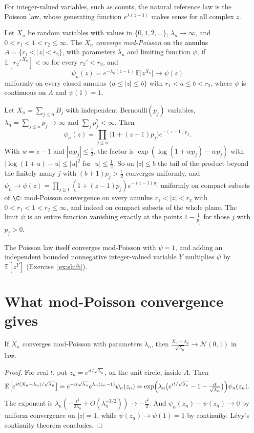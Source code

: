 For integer-valued variables, such as counts, the natural reference law is the Poisson law, whose generating function $e^{\lambda(z-1)}$ makes sense for all complex $z$.

\begin{definition}\label{def:modpoisson}
Let $X_n$ be random variables with values in $\{0,1,2,\dots\}$, $\lambda_n\to\infty$, and $0<r_1<1<r_2\le\infty$. The $X_n$ \emph{converge mod-Poisson} on the annulus $A=\{r_1<|z|<r_2\}$, with parameters $\lambda_n$ and limiting function
$\psi$, if $\mathbb E[r_2'^{\,X_n}]<\infty$ for every $r_2'<r_2$, and
\[
\psi_n(z)=e^{-\lambda_n(z-1)}\,\mathbb E\bigl[z^{X_n}\bigr]\longrightarrow\psi(z)
\]
uniformly on every closed annulus $\{a\le|z|\le b\}$ with $r_1<a\le b<r_2$, where $\psi$ is continuous on $A$ and $\psi(1)=1$.
\end{definition}

\begin{example}\label{ex:bernsums}
Let $X_n=\sum_{j\le n}B_j$ with independent Bernoulli$(p_j)$ variables, $\lambda_n=\sum_{j\le n}p_j\to\infty$ and $\sum_jp_j^2<\infty$. Then
\[
\psi_n(z)=\prod_{j\le n}\bigl(1+(z-1)p_j\bigr)e^{-(z-1)p_j}.
\]
With $w=z-1$ and $|wp_j|\le\frac12$, the factor is $\exp(\log(1+wp_j)-wp_j)$ with $|\log(1+u)-u|\le|u|^2$ for $|u|\le\frac12$. So on $|z|\le b$ the tail of the product beyond the finitely many $j$ with $(b+1)p_j>\frac12$ converges
uniformly, and $\psi_n\to\psi(z)=\prod_{j\ge1}(1+(z-1)p_j)e^{-(z-1)p_j}$ uniformly on compact subsets of $\C$: mod-Poisson convergence on every annulus $r_1<|z|<r_2$ with $0<r_1<1<r_2\le\infty$, and indeed on compact subsets of the whole plane. The limit $\psi$ is an entire function vanishing
exactly at the points $1-\frac1{p_j}$ for those $j$ with $p_j>0$.
\end{example}

The Poisson law itself converges mod-Poisson with $\psi=1$, and adding an independent bounded nonnegative integer-valued variable $Y$ multiplies $\psi$ by $\mathbb E[z^Y]$ (Exercise~\ref{ex:shift}).

\section{What mod-Poisson convergence gives}

\begin{theorem}\label{thm:modpoissonclt}
If $X_n$ converges mod-Poisson with parameters $\lambda_n$, then $\frac{X_n-\lambda_n}{\sqrt{\lambda_n}}\to\mathcal N(0,1)$ in law.
\end{theorem}
\begin{proof}
For real $t$, put $z_n=e^{it/\sqrt{\lambda_n}}$, on the unit circle, inside $A$. Then
\[
\mathbb E\bigl[e^{it(X_n-\lambda_n)/\sqrt{\lambda_n}}\bigr]=e^{-it\sqrt{\lambda_n}}e^{\lambda_n(z_n-1)}\psi_n(z_n)=\exp\Bigl(\lambda_n\bigl(e^{it/\sqrt{\lambda_n}}-1-\tfrac{it}{\sqrt{\lambda_n}}\bigr)\Bigr)\psi_n(z_n).
\]
The exponent is $\lambda_n(-\frac{t^2}{2\lambda_n}+O(\lambda_n^{-3/2}))\to-\frac{t^2}2$. And $\psi_n(z_n)-\psi(z_n)\to0$ by uniform convergence on $|z|=1$, while $\psi(z_n)\to\psi(1)=1$ by continuity. L\'evy's continuity theorem concludes.
\end{proof}


